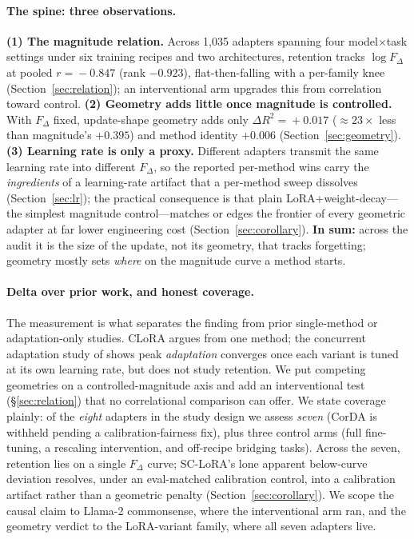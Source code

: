 \documentclass[11pt]{article}
\newcommand{\dw}{F_{\Delta}}
\begin{document}
\paragraph{The spine: three observations.}
\textbf{(1) The magnitude relation.} Across 1{,}035 adapters spanning four
model$\times$task settings under six training recipes and two architectures,
retention tracks $\log\dw$ at pooled $r\!=\!-0.847$ (rank $-0.923$),
flat-then-falling with a per-family knee (Section~\ref{sec:relation}); an
interventional arm upgrades this from correlation toward control.
\textbf{(2) Geometry adds little once magnitude is controlled.} With $\dw$ fixed,
update-shape geometry adds only $\Delta R^2\!=\!+0.017$ ($\approx\!23\times$ less than magnitude's
$+0.395$) and method identity $+0.006$ (Section~\ref{sec:geometry}).
\textbf{(3) Learning rate is only a proxy.} Different adapters transmit the same
learning rate into different $\dw$, so the reported per-method wins carry the
\emph{ingredients} of a learning-rate artifact that a per-method sweep dissolves
(Section~\ref{sec:lr}); the practical consequence is that plain
LoRA{+}weight-decay---the simplest magnitude control---matches or edges the
frontier of every geometric adapter at far lower engineering cost
(Section~\ref{sec:corollary}). \textbf{In sum:} across the audit it is the size
of the update, not its geometry, that tracks forgetting; geometry mostly sets
\emph{where} on the magnitude curve a method starts.

\paragraph{Delta over prior work, and honest coverage.} The measurement is what
separates the finding from prior single-method or adaptation-only studies. CLoRA
argues from one method; the concurrent adaptation study of \citet{lee2026lr}
shows peak \emph{adaptation} converges once each variant is tuned at its own
learning rate, but does not study retention. We put competing geometries on a
controlled-magnitude axis and add an interventional test (§\ref{sec:relation})
that no correlational comparison can offer. We state coverage plainly: of the
\emph{eight} adapters in the study design we assess \emph{seven} (CorDA is
withheld pending a calibration-fairness fix), plus three control arms (full
fine-tuning, a rescaling intervention, and off-recipe bridging tasks). Across the
seven, retention lies on a single $\dw$ curve; SC-LoRA's lone
apparent below-curve deviation resolves, under an eval-matched calibration
control, into a calibration artifact rather than a geometric penalty
(Section~\ref{sec:corollary}). We scope the causal claim to Llama-2 commonsense,
where the interventional arm ran, and the geometry verdict to the LoRA-variant
family, where all seven adapters live.
\end{document}
